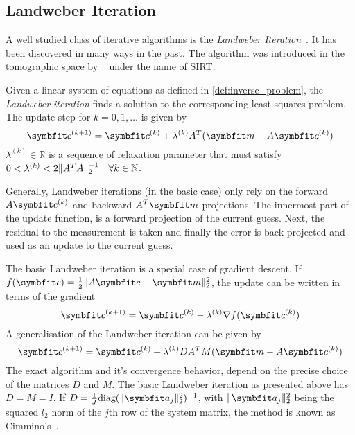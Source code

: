 \subsection{Landweber Iteration}\label{subsec:landweber_iteration}

A well studied class of iterative algorithms is the \textit{Landweber
	Iteration}~\cite{landweber_iteration_1951}. It has been discovered in many ways in the past.
The algorithm was introduced in the tomographic space by
\citeauthor{gilbert_iterative_1972}~\cite{gilbert_iterative_1972} under the name of
\gls{SIRT}.

\begin{definition}\label{def:landweber_iteration}
	Given a linear system of equations as defined in \autoref{def:inverse_problem}, the
	\textit{Landweber iteration} finds a solution to the corresponding least squares problem. The update
	step for \(k = 0, 1, \dots\) is given by
	\[
		\mvec{c}^{(k+1)} = \mvec{c}^{(k)} + \lambda^{(k)} A^T(\mvec{m} - A\mvec{c}^{(k)})
	\]
	\(\lambda^{(k)} \in \mathbb{R}\) is a sequence of relaxation parameter that must satisfy
	\(0 < \lambda^{(k)} < 2 \norm{A^T A}_2^{-1}\quad \forall k \in \mathbb{N}\).
\end{definition}

Generally, Landweber iterations (in the basic case) only rely on the forward \(A\mvec{c}^{(k)}\) and backward
\(A^T \mvec{m}\) projections. The innermost part of the update function, is a forward projection of the
current guess. Next, the residual to the measurement is taken and finally the error is back
projected and used as an update to the current guess.

The basic Landweber iteration is a special case of gradient descent. If \(f(\mvec{c}) = \frac{1}{2}
\norm{A\mvec{c} - \mvec{m}}_2^2\), the update can be written in terms of the gradient
\begin{equation}
	\mvec{c}^{(k+1)} = \mvec{c}^{(k)} - \lambda^{(k)} \nabla f(\mvec{c}^{(k)})
\end{equation}
A generalisation of the Landweber iteration can be given by
\begin{equation}
	\mvec{c}^{(k+1)} = \mvec{c}^{(k)} + \lambda^{(k)} DA^TM(\mvec{m} - A\mvec{c}^{(k)})
\end{equation}
The exact algorithm and it's convergence behavior, depend on the precise choice of the matrices
\(D\) and \(M\). The basic Landweber iteration as presented above has \(D = M = I\). If \(D =
\frac{1}{J} \text{diag}(\norm{\mvec{a}_j}^2_2)^{-1}\), with \(\norm{\mvec{a}_j}^2_2\) being the
squared \(l_2\) norm of the \(j\)th row of the system matrix, the method is known as
Cimmino's~\cite[Chapter~6.1]{hansen_discrete_2010}.


